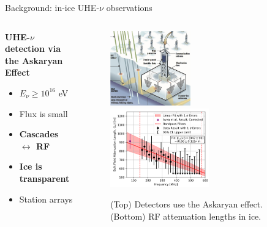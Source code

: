 \documentclass{beamer}
\begin{document}
\begin{frame}{Background: in-ice UHE-$\nu$ observations}
\small
\begin{columns}[T]
\begin{column}{0.32\textwidth}
\textbf{\alert{UHE-$\nu$ detection via the Askaryan Effect}}
\begin{itemize}
\item $E_{\nu} \geq 10^{16}$ eV
\item Flux is small
\item \textbf{Cascades $\leftrightarrow$ RF}
\item \textbf{Ice is transparent}
\item Station arrays
\end{itemize}
\end{column}
\begin{column}{0.68\textwidth}
\begin{figure}
\centering
\includegraphics[width=0.45\textwidth]{ARIANNA_principle.png} \\
\includegraphics[width=0.55\textwidth]{atten_greenland.png}
\caption{\footnotesize (Top) Detectors use the Askaryan effect. (Bottom) RF attenuation lengths in ice.}
\end{figure}
\end{column}
\end{columns}
\end{frame}
\end{document}

